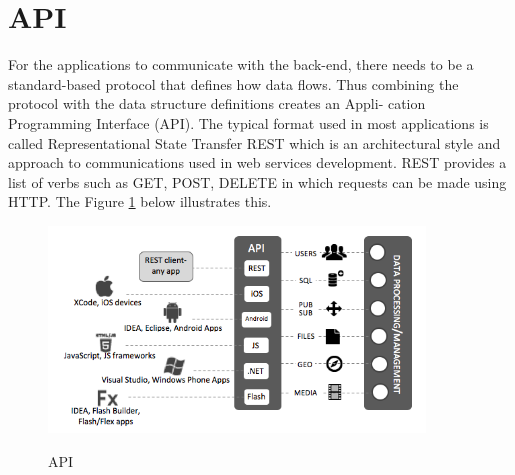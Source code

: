 \section{API}

For the applications to communicate with the back-end, there needs to be a standard-based protocol that defines how data flows. Thus combining the protocol with the data structure definitions creates an Appli- cation Programming Interface (API). The typical format used in most applications is called Representational State Transfer REST which is an architectural style and approach to communications used in web services development. REST provides a list of verbs such as GET, POST, DELETE in which requests can be made using HTTP. The Figure \ref{fig:api} below illustrates this.

\begin{figure}[!h]
    \caption{API \cite{backendless}}
    \centering
    \includegraphics[width=100mm]{images/baas-apis}
    \label{fig:api}
\end{figure}


